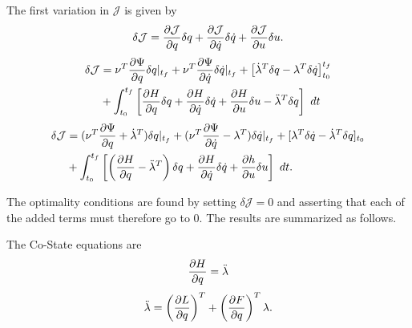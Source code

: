 The first variation in $\mathcal{  J  }$ is given by
\begin{equation}
    \delta  \mathcal{  J  } = \frac{\partial \mathcal{  J  }}{\partial q} \delta q + \frac{\partial \mathcal{  J  }}{\partial \dot q} \delta \dot q   +  \frac{\partial \mathcal{  J  }}{\partial u} \delta u.
\end{equation}
\begin{equation}
\begin{split}
    \delta \mathcal{  J  } &= \nu^T \frac{\partial \Psi}{\partial q}\delta q |_{t_f}
                 + \nu^T \frac{\partial \Psi}{\partial \dot q}\delta \dot q |_{t_f}
                 + \big[ \dot \lambda^T \delta q - \lambda^T  \delta \dot q\big]_{t_0}^{t_f}\\
               &+ \int_{t_0}^{t_f}  \left[ \frac{\partial H}{\partial q}\delta q +
                                           \frac{\partial H}{\partial \dot q}\delta \dot q
                                           + \frac{\partial H}{\partial u}\delta u
                                           - \ddot \lambda^T  \delta q  \right]   \text{  } dt\\
\end{split}
\end{equation}
\begin{equation}
\begin{split}
    \delta \mathcal{  J  } &= (\nu^T\frac{\partial \Psi}{\partial q} + \dot \lambda^T) \delta q |_{t_f}
                 + (\nu^T\frac{\partial \Psi}{\partial \dot q} - \lambda^T) \delta \dot q |_{t_f}
                 +  [ \lambda^T  \delta \dot q - \dot \lambda^T \delta q]_{t_0}\\
              & + \int_{t_0}^{t_f} \left[ \left( \frac{\partial H}{\partial q} - \ddot \lambda^T \right) \delta q
                                              + \frac{\partial H}{\partial \dot q} \delta \dot q +  \frac{\partial h}{\partial u} \delta u \right] \text{  } dt.\\
\end{split}
\end{equation}

The optimality conditions are found by setting $\delta \mathcal{  J  } = 0 $ and asserting that each of the added terms must therefore go to 0. The results are summarized as follows.

The Co-State equations are
\begin{equation}
    \label{costate}
    \frac{\p H}{ \p q } = \ddot \lambda
\end{equation}
\begin{equation}
    \ddot \lambda = \left( \frac{\partial L}{\partial q}  \right)^T + \left( \frac{\partial F}{\partial q} \right)^T \lambda .
\end{equation}

